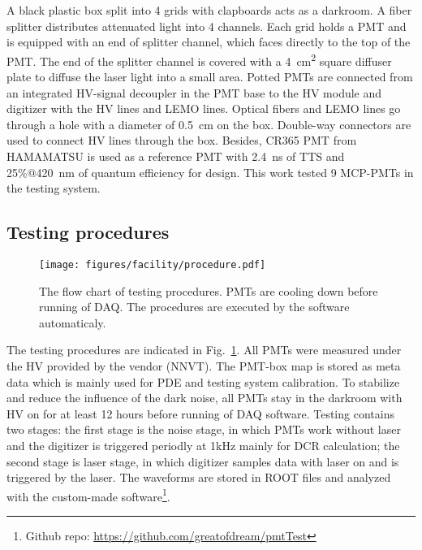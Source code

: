 A black plastic box split into 4 grids with clapboards acts as a darkroom. A fiber splitter %
distributes attenuated light into 4 channels. Each grid holds a PMT and is equipped with an end of splitter channel, which faces directly to the top of the PMT. The end of the splitter channel is covered with a \SI{4}{cm\tothe{2}} square diffuser plate to diffuse the laser light into a small area. Potted PMTs are connected from an integrated HV-signal decoupler in the PMT base to the HV module and digitizer with the HV lines and LEMO lines. Optical fibers and LEMO lines go through a hole with a diameter of \SI{0.5}{cm} on the box. Double-way connectors are used to connect HV lines through the box. Besides, CR365 PMT \cite{BJBS} from HAMAMATSU is used as a reference PMT with \SI{2.4}{ns} of TTS and 25\%@\SI{420}{nm} of quantum efficiency for design. %
This work tested 9 MCP-PMTs in the testing system.

\subsection{Testing procedures}
\begin{figure}
    \centering
    \texttt{[image: figures/facility/procedure.pdf]}
    \caption{The flow chart of testing procedures. PMTs are cooling down before running of DAQ. The procedures are executed by the software automaticaly.}
    \label{fig:testingprocedure}
\end{figure}

The testing procedures are indicated in Fig.~\ref{fig:testingprocedure}. All PMTs were measured under the HV provided by the vendor (NNVT). %
The PMT-box map is stored as meta data which is mainly used for PDE and testing system calibration. To stabilize and reduce the influence of the dark noise, all PMTs stay in the darkroom with HV on for at least 12 hours before running of DAQ software. Testing contains two stages: the first stage is the noise stage, in which PMTs work without laser and the digitizer is triggered periodly at 1kHz mainly for DCR calculation; the second stage is laser stage, in which digitizer samples data with laser on and is triggered by the laser. The waveforms are stored in ROOT files and analyzed with the custom-made software\footnote{Github repo: \url{https://github.com/greatofdream/pmtTest}}.
